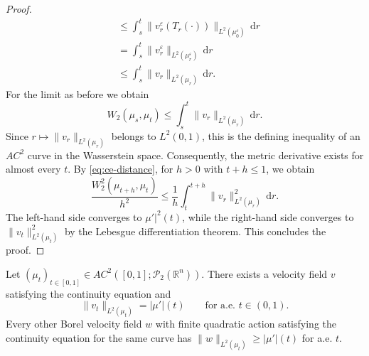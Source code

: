 \begin{proof}
\begin{align*}
											 &\leq\int_s^t \lVert v_r^\varepsilon(T_r(\cdot))\rVert_{L^2(\mu_0^\varepsilon)}\,\mathrm dr\\
											 &=\int_s^t \lVert v_r^\varepsilon\rVert_{L^2(\mu_r^\varepsilon)}\,\mathrm dr\\
											 &\leq\int_s^t \lVert v_r\rVert_{L^2(\mu_r)}\,\mathrm dr.
\end{align*}
For the limit as before %
we obtain
\begin{equation*}
	W_2(\mu_s,\mu_t)\leq\int_s^t \lVert v_r\rVert_{L^2(\mu_r)}\,\mathrm dr.
\end{equation*}
Since $r\mapsto \lVert v_r\rVert_{L^2(\mu_r)}$ belongs to $L^2(0,1)$, this is the defining inequality of an $AC^2$ curve in the Wasserstein space. Consequently, the metric derivative exists for almost every $t$. By \eqref{eq:ce-distance}, for $h>0$ with $t+h\leq 1$, we obtain
$$
\frac{W_2^2(\mu_{t+h},\mu_t)}{h^2}\leq\frac{1}{h}\int_t^{t+h} \lVert v_r\rVert_{L^2(\mu_r)}^2\,\mathrm dr.	
$$
The left-hand side converges to $\mu'|^2(t)$, while the right-hand side converges to $\lVert v_t\rVert_{L^2(\mu_t)}^2$ by the Lebesgue differentiation theorem. This concludes the proof.
\end{proof}
\begin{corollary}
	Let $(\mu_t)_{t\in[0,1]}\in AC^2([0,1];\mathscr{P}_2(\mathbb{R}^n))$. There exists a velocity field $v$ satisfying the continuity equation and 
	$$
	\lVert v_t\rVert_{L^2(\mu_t)} = |\mu'|(t)\qquad \text{for a.e. }t\in(0,1).	
	$$
	Every other Borel velocity field $w$ with finite quadratic action satisfying the continuity equation for the same curve has $\lVert w\rVert_{L^2(\mu_t)}\geq|\mu'|(t)$ for a.e. $t$.
\end{corollary}


